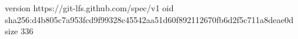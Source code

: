 version https://git-lfs.github.com/spec/v1
oid sha256:d4b805c7a953fcd9f99328c45542aa51d60f892112670fb6d2f5c711a8deae0d
size 336
